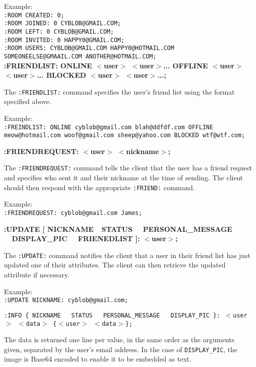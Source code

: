 Example: \\
\texttt{:ROOM CREATED: 0;} \\
\texttt{:ROOM JOINED: 0 CYBLOB@GMAIL.COM;} \\
\texttt{:ROOM LEFT: 0 CYBLOB@GMAIL.COM;} \\
\texttt{:ROOM INVITED: 0 HAPPY0@GMAIL.COM;} \\
\texttt{:ROOM USERS: CYBLOB@GMAIL.COM HAPPY0@HOTMAIL.COM \\SOMEONEELSE@GMAAIL.COM ANOTHER@HOTMAIL.COM;} \\

{\bf :FRIENDLIST: ONLINE $<$user$>$ $<$user$>$... OFFLINE $<$user$>$ $<$user$>$... BLOCKED $<$user$>$ $<$user$>$...;}

The \texttt{:FRIENDLIST:} command specifies the user's friend list using the format specified above.

Example: \\
\texttt{:FREINDLIST: ONLINE cyblob@gmail.com blah@ddfdf.com OFFLINE meow@hotmail.com woof@gmail.com sheep@yahoo.com BLOCKED wtf@wtf.com;}

{\bf :FRIENDREQUEST: $<$user$>$ $<$nickname$>$;}

The \texttt{:FRIENDREQUEST:} command tells the client that the user has a friend request and specifies who sent it and their nickname at the time of sending. The client should then respond with the appropriate \texttt{:FRIEND:} command.

Example: \\
\texttt{:FRIENDREQUEST: cyblob@gmail.com James;}

{\bf :UPDATE [ NICKNAME\ \vline \ STATUS \ \vline \ PERSONAL\_MESSAGE \ \vline \ DISPLAY\_PIC \ \vline \ FRIENEDLIST  ]: $<$user$>$;}

The \texttt{:UPDATE:} command notifies the client that a user in their friend list has just updated one of their attributes. The client can then retrieve the updated attribute if necessary.

Example: \\
\texttt{:UPDATE NICKNAME: cyblob@gmail.com;}

\texttt{:INFO \{ NICKNAME \ \vline \ STATUS \ \vline \ PERSONAL\_MESSAGE \ \vline \ DISPLAY\_PIC \}: $<$user$>$ $<$data$>$ \{$<$user$>$ $<$data$>$\};} 

The data is returned one line per value, in the same order as the arguments given, separated by the user's email address. In the case of \texttt{DISPLAY\_PIC}, the image is Base64 encoded to enable it to be embedded as text.

